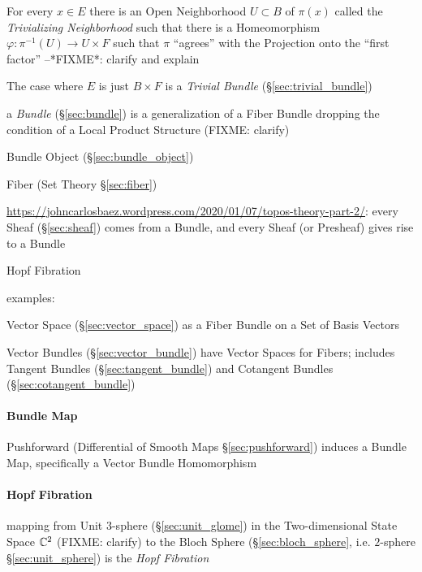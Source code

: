 For every $x \in E$ there is an Open Neighborhood $U \subset B$ of $\pi(x)$
called the \emph{Trivializing Neighborhood} such that there is a Homeomorphism
$\varphi : \pi^{-1}(U) \rightarrow U \times F$ such that $\pi$ ``agrees'' with
the Projection onto the ``first factor'' --*FIXME*: clarify and explain

The case where $E$ is just $B \times F$ is a \emph{Trivial Bundle}
(\S\ref{sec:trivial_bundle})

\fist a \emph{Bundle} (\S\ref{sec:bundle}) is a generalization of a Fiber Bundle
dropping the condition of a Local Product Structure (FIXME: clarify)

\fist Bundle Object (\S\ref{sec:bundle_object})

\fist Fiber (Set Theory \S\ref{sec:fiber})

\url{https://johncarlosbaez.wordpress.com/2020/01/07/topos-theory-part-2/}:
every Sheaf (\S\ref{sec:sheaf}) comes from a Bundle, and every Sheaf (or
Presheaf) gives rise to a Bundle

Hopf Fibration

examples:

Vector Space (\S\ref{sec:vector_space}) as a Fiber Bundle on a Set of Basis
Vectors

Vector Bundles (\S\ref{sec:vector_bundle}) have Vector Spaces for Fibers;
includes Tangent Bundles (\S\ref{sec:tangent_bundle}) and Cotangent Bundles
(\S\ref{sec:cotangent_bundle})




\paragraph{Bundle Map}\label{sec:bundle_map}\hfill

Pushforward (Differential of Smooth Maps \S\ref{sec:pushforward}) induces a
Bundle Map, specifically a Vector Bundle Homomorphism



\paragraph{Hopf Fibration}\label{sec:hopf_fibration}\hfill

mapping from Unit $3$-sphere (\S\ref{sec:unit_glome}) in the Two-dimensional
State Space $\mathbb{C}^2$ (FIXME: clarify) to the Bloch Sphere
(\S\ref{sec:bloch_sphere}, i.e. $2$-sphere \S\ref{sec:unit_sphere}) is the
\emph{Hopf Fibration}



